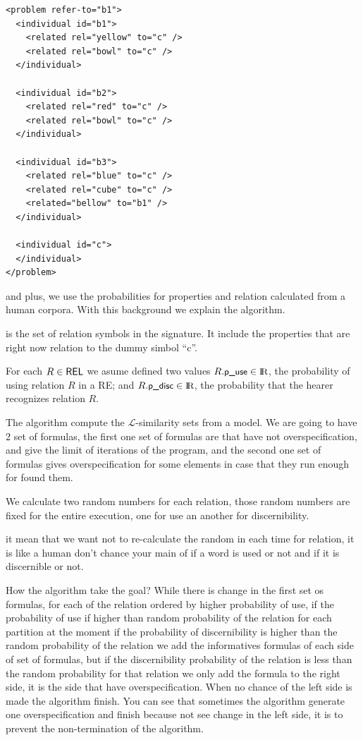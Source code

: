 \begin{verbatim}
<problem refer-to="b1">
  <individual id="b1">
    <related rel="yellow" to="c" />
    <related rel="bowl" to="c" />
  </individual>

  <individual id="b2">
    <related rel="red" to="c" />
    <related rel="bowl" to="c" />
  </individual>

  <individual id="b3">
    <related rel="blue" to="c" />
    <related rel="cube" to="c" />
    <related="bellow" to="b1" />
  </individual>
  
  <individual id="c">
  </individual>
</problem>
\end{verbatim}

and plus, we use the probabilities for properties and relation calculated from a human corpora.
With this background we explain the algorithm.

\REL is the set of relation symbols in the signature. It include the properties that are right now relation to the dummy simbol ``c''. 

For each $R \in \textsf{REL}$ we asume defined two values $R.\small \textsf{p\_use} \in \textrm{I}\!\textrm{R}$, the 
probability of using relation $R$ in a RE; and $R.\small \textsf{p\_disc} \in \textrm{I}\!\textrm{R}$, the 
probability that the hearer recognizes relation $R$. 

The algorithm compute the $\mathcal{L}$-similarity sets from a model. 
We are going to have 2 set of formulas, the first one set of formulas are that have not overspecification, and give the limit of iterations of the program, and the second one set of formulas gives overspecification for some elements in case that they run enough for found them.

We calculate two random numbers for each relation, those random numbers are fixed for the entire execution, one for use an another for discernibility. 

it mean that we want not to re-calculate the random in each time for relation, it is like a human don't chance your main of if a word is used or not and if it is discernible or not.

How the algorithm take the goal?
While there is change in the first set os formulas, for each of the relation ordered by higher probability of use, if the probability of use if higher than random probability of the relation for each partition at the moment if the probability of discernibility is higher than the random probability of the relation we add the informatives formulas of each side of set of formulas, but if the discernibility probability of the relation is less than the random probability for that relation we only add the formula to the right side, it is the side that have overspecification.
When no chance of the left side is made the algorithm finish. You can see that sometimes the algorithm generate one overspecification and finish because not see change in the left side, it is to prevent the non-termination of the algorithm.

